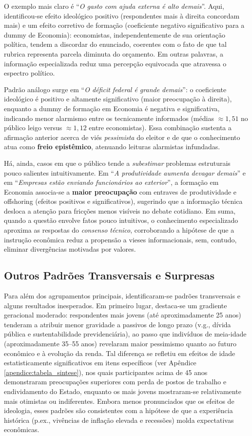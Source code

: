O exemplo mais claro é ``\textit{O gasto com ajuda externa é alto demais}''. Aqui, identificou-se efeito ideológico positivo (respondentes mais à direita concordam mais) e um efeito corretivo de formação (coeficiente negativo significativo para a dummy de Economia): economistas, independentemente de sua orientação política, tendem a discordar do enunciado, coerentes com o fato de que tal rubrica representa parcela diminuta do orçamento. Em outras palavras, a informação especializada reduz uma percepção equivocada que atravessa o espectro político.

Padrão análogo surge em ``\textit{O déficit federal é grande demais}'': o coeficiente ideológico é positivo e altamente significativo (maior preocupação à direita), enquanto a dummy de formação em Economia é negativa e significativa, indicando menor alarmismo entre os tecnicamente informados (médias $\approx1{,}51$ no público leigo versus $\approx1{,}12$ entre economistas). Essa combinação sustenta a afirmação anterior acerca de viés \textit{pessimista} do eleitor e de que o conhecimento atua como \textbf{freio epistêmico}, atenuando leituras alarmistas infundadas.

Há, ainda, casos em que o público tende a \textit{subestimar} problemas estruturais pouco salientes intuitivamente. Em ``\textit{A produtividade aumenta devagar demais}'' e em ``\textit{Empresas estão enviando funcionários ao exterior}'', a formação em Economia associa-se a \textbf{maior preocupação} com entraves de produtividade e offshoring (efeitos positivos e significativos), sugerindo que a informação técnica desloca a atenção para fricções menos visíveis no debate cotidiano. Em suma, quando a questão envolve fatos pouco intuitivos, o conhecimento especializado aproxima as respostas do \textit{consenso técnico}, corroborando a hipótese de que a instrução econômica reduz a propensão a vieses informacionais, sem, contudo, eliminar divergências motivadas por valores.

\subsection{Outros Padrões Transversais e Surpresas}
Para além dos agrupamentos principais, identificaram-se padrões transversais e alguns resultados inesperados. Em primeiro lugar, destaca-se um gradiente geracional moderado: respondentes mais jovens (até aproximadamente 25 anos) tenderam a atribuir menor gravidade a passivos de longo prazo (v.g., dívida pública e sustentabilidade previdenciária), ao passo que indivíduos de meia-idade (aproximadamente 35--55 anos) revelaram maior pessimismo quanto ao futuro econômico e à evolução da renda. Tal diferença se refletiu em efeitos de idade estatisticamente significativos em itens específicos (ver Apêndice \autoref{apendice:tabela_sintese}), nos quais participantes acima de 45 anos demonstraram preocupações superiores com perda de postos de trabalho e endividamento do Estado, enquanto os mais jovens mostraram-se relativamente mais otimistas ou indiferentes. Embora menos pronunciados que os efeitos de ideologia, esses padrões são consistentes com a hipótese de que a experiência histórica (p.ex., vivências de inflação elevada e recessões) molda expectativas econômicas.

